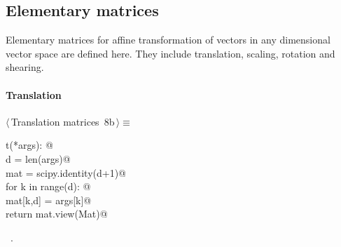 \documentclass[11pt,oneside]{article}	%
\begin{document}
\subsection{Elementary matrices}
Elementary matrices for affine transformation of vectors in any dimensional vector space are defined here. They include translation, scaling, rotation and shearing. 

\paragraph{Translation}
\begin{flushleft} \small \label{scrap17}
\protect{}$\langle\,$Translation matrices\nobreak\ {\footnotesize 8b}$\,\rangle\equiv$
\vspace{-1ex}
\begin{list}{}{} \item
\mbox{}\verb@def t(*args): @\\
\mbox{}\verb@   d = len(args)@\\
\mbox{}\verb@   mat = scipy.identity(d+1)@\\
\mbox{}\verb@   for k in range(d): @\\
\mbox{}\verb@      mat[k,d] = args[k]@\\
\mbox{}\verb@   return mat.view(Mat)@\\
\mbox{}\verb@@{\NWsep}
\end{list}
\vspace{-1ex}
\footnotesize\addtolength{\baselineskip}{-1ex}
\begin{list}{}{\setlength{\itemsep}{-\parsep}\setlength{\itemindent}{-\leftmargin}}
\item \NWtxtMacroRefIn\ .
\end{list}
\end{flushleft}
\end{document}
